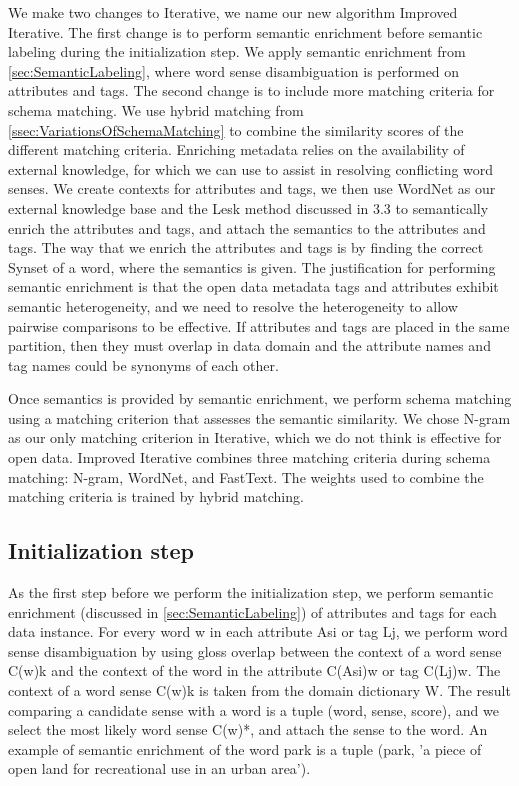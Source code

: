 We make two changes to Iterative, we name our new algorithm Improved Iterative. The first change is to perform semantic enrichment before semantic labeling during the initialization step. We apply semantic enrichment from \autoref{sec:SemanticLabeling}, where word sense disambiguation is performed on attributes and tags. The second change is to include more matching criteria for schema matching. We use hybrid matching from \autoref{ssec:VariationsOfSchemaMatching} to combine the similarity scores of the different matching criteria.
Enriching metadata relies on the availability of external knowledge, for which we can use to assist in resolving conflicting word senses. We create contexts for attributes and tags, we then use WordNet as our external knowledge base and the Lesk method discussed in 3.3 to semantically enrich the attributes and tags, and attach the semantics to the attributes and tags. The way that we enrich the attributes and tags is by finding the correct Synset of a word, where the semantics is given. The justification for performing semantic enrichment is that the open data metadata tags and attributes exhibit semantic heterogeneity, and we need to resolve the heterogeneity to allow pairwise comparisons to be effective. If attributes and tags are placed in the same partition, then they must overlap in data domain and the attribute names and tag names could be synonyms of each other.

Once semantics is provided by semantic enrichment, we perform schema matching using a matching criterion that assesses the semantic similarity. We chose N-gram as our only matching criterion in Iterative, which we do not think is effective for open data. Improved Iterative combines three matching criteria during schema matching: N-gram, WordNet, and FastText. The weights used to combine the matching criteria is trained by hybrid matching.

\subsection{Initialization step}

As the first step before we perform the initialization step, we perform semantic enrichment (discussed in \autoref{sec:SemanticLabeling}) of attributes and tags for each data instance. For every word w in each attribute Asi or tag Lj, we perform word sense disambiguation by using gloss overlap between the context of a word sense C(w)k and the context of the word in the attribute C(Asi)w or tag C(Lj)w. The context of a word sense C(w)k is taken from the domain dictionary W. The result comparing a candidate sense with a word is a tuple (word, sense, score), and we select the most likely word sense C(w)*, and attach the sense to the word. An example of semantic enrichment of the word park is a tuple (park, 'a piece of open land for recreational use in an urban area').

